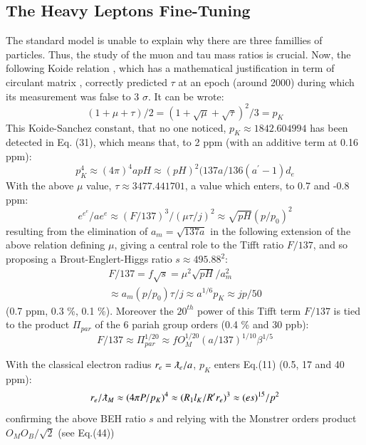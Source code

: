 \documentclass[twoside,draft]{article}
\begin{document}
\begin{sloppypar}
\subsection {The Heavy Leptons Fine-Tuning}
The standard model is unable to explain why there are three famillies of particles. Thus, the study of the muon and tau mass ratios is crucial. Now, the following Koide relation \cite{Koide}, which has a mathematical justification in term of circulant matrix \cite{Brannen}, correctly predicted $\tau$ at an epoch (around 2000) during which its measurement was false to 3 $\sigma$. It can be wrote:
\begin{equation}
(1 + \mu + \tau)/2 = (1 + \sqrt\mu + \sqrt\tau)^2/3 = p_K
\end{equation}
This Koide-Sanchez constant, that no one noticed, $p_K \approx 1842.604994$ has been detected in Eq. (31), which means that, to 2 ppm (with an additive term at 0.16 ppm):
\begin{equation}
p_K^4 \approx (4\pi)^4 apH \approx (pH)^2 (137a/136(a^{\prime}-1) d_e
\end{equation}
With the above $\mu$ value, $\tau \approx 3477.441701$, a value which enters, to 0.7 and -0.8 ppm:
\begin{equation}
e^{e^e}/a e^e \approx (F/137)^{3}/ (\mu\tau/j)^2 \approx  \sqrt{pH} (p/p_0)^2 
\end{equation}
resulting from the elimination of $a_m = \sqrt{137a}$ in the following extension of the above relation defining $\mu$, giving a central role to the Tifft ratio $F/137$, and so proposing a Brout-Englert-Higgs ratio $s \approx 495.88^2$:
$$
\begin{array}{ll}
%
\displaystyle
F/137 = f \sqrt{s} = \mu^2 \sqrt{pH}/a_m^2 \\ \approx a_m (p/p_0) \tau /j \approx a^{1/6}p_K \approx jp/50 
\end{array}
$$
(0.7 ppm, 0.3 \%, 0.1 \%). Moreover the $20^{th}$ power of this Tifft term $F/137$ is tied to the product $\Pi_{par}$ of the 6 pariah group orders (0.4 \% and 30 ppb):
$$ F/137 \approx \Pi_{par}^{1/20} \approx f O_M^{1/20}(a/137)^{1/10}\beta^{1/5}$$ 

 With the classical electron radius $r_e = \lambdabar_e/a$, $p_K$ enters Eq.(11) (0.5, 17 and 40 ppm):
\begin{equation}
r_{e}/\lambdabar_M \approx(4\pi P/p_K)^4 \approx (R_1l_K/R^{\prime}r_e)^3 \approx (es)^{15}/p^2  
\end{equation}
confirming the above BEH ratio $s$ and relying with the Monstrer orders product $O_MO_B/\sqrt{2}$ (see Eq.(44))


\end{sloppypar}
\end{document}
